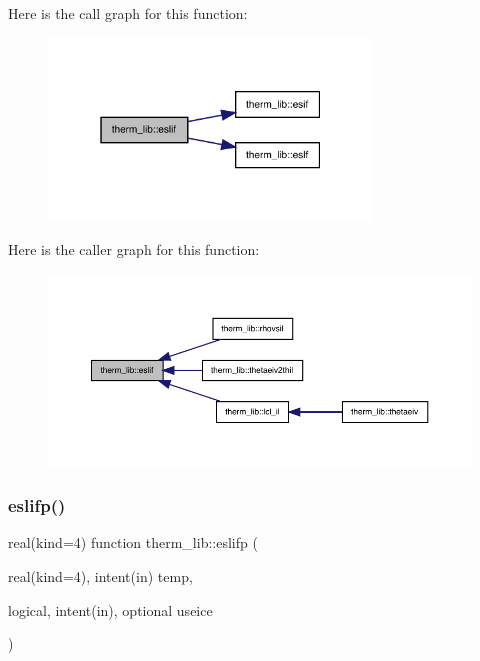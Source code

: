 Here is the call graph for this function\+:
\nopagebreak
\begin{figure}[H]
\begin{center}
\leavevmode
\includegraphics[width=244pt]{namespacetherm__lib_a5cebdf07920a9af5a0cbc49bafbc30b4_cgraph}
\end{center}
\end{figure}
Here is the caller graph for this function\+:
\nopagebreak
\begin{figure}[H]
\begin{center}
\leavevmode
\includegraphics[width=350pt]{namespacetherm__lib_a5cebdf07920a9af5a0cbc49bafbc30b4_icgraph}
\end{center}
\end{figure}
\mbox{\label{namespacetherm__lib_ac882ac1ca8840594af71761fc7c42306}} 
\subsubsection{\texorpdfstring{eslifp()}{eslifp()}}
{\footnotesize\ttfamily real(kind=4) function therm\+\_\+lib\+::eslifp (\begin{DoxyParamCaption}\item[{real(kind=4), intent(in)}]{temp,  }\item[{logical, intent(in), optional}]{useice }\end{DoxyParamCaption})}

